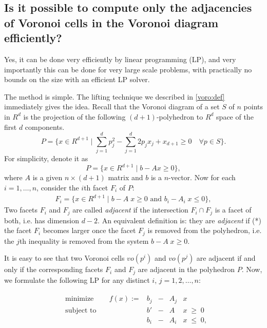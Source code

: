 \documentclass[a4paper,12pt]{article}
\begin{document}
\subsection{Is it possible to compute only the adjacencies of Voronoi cells in
the Voronoi diagram efficiently?}
\label{voro:adjacency}

Yes, it can be done very efficiently by linear programming (LP), and
very importantly this can be done for very large scale problems,
with practically no bounds on the size with an efficient LP solver.

The method is simple.  The lifting technique we described in
\ref{voro:def} immediately gives the idea.  Recall that
the Voronoi diagram
of a set $S$ of $n$ points in $R^d$
 is the projection of the following $(d+1)$-polyhedron to
$R^d$ space of the first $d$ components.
\[
P = \{ x\in R^{d+1} \; | \;  \sum_{j=1}^d p_j^2 - \sum_{j=1}^d 2 p_j x_j + x_{d+1} \ge 0
  \quad \forall p \in S \}.
\]
For simplicity, denote it as
\[
P = \{ x\in R^{d+1} \; | \;  b - A x \ge 0 \},
\]
where $A$ is a given $n \times (d+1)$ matrix and $b$ is a $n$-vector.
Now for each $i=1,\ldots, n$, consider the $i$th facet $F_i$ of $P$:
\begin{align} \label{eq:voro_facet}
F_i = \{ x\in R^{d+1} \; | \;  b - A\; x \ge 0 \mbox{ and }
 b_i - A_i \; x \le 0 \},
\end{align} 
Two facets $F_i$ and $F_j$ are called {\em adjacent\/} if 
the intersection $F_i \cap F_j$ is a facet of both, i.e.
has dimension $d-2$. An equivalent definition is: they are
{\em adjacent\/} if (*) the facet $F_i$ becomes larger once the
facet $F_j$ is removed from the polyhedron, i.e. the $j$th
inequality is removed from the system $b - A \; x \ge 0$. 

It is easy to see that two Voronoi cells $vo(p^i)$ and $vo(p^j)$
are adjacent if and only if the corresponding facets $F_i$ and
$F_j$ are adjacent in the polyhedron $P$.
Now, we formulate the following LP for any
distinct $i$, $j = 1,2, \ldots,n$:

\begin{align} \label{eq:voro_facet_lp}
\begin{array}{lllllll}
&\text{minimize}    & \quad f(x) :=  & b_j & - &  A_j & x  \\
&\text{subject to}  &                & b'  & - &  A & x \; \ge \; 0 \\  
&                   &                & b_i & - &  A_i & x \; \le \; 0,
\end{array}
\end{align}
\end{document}

